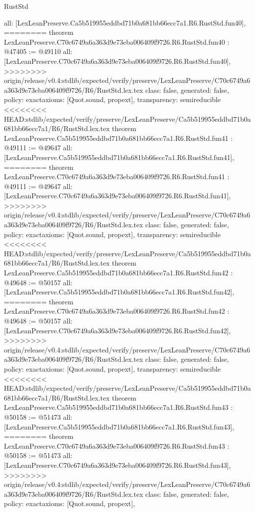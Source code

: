 \begin{lexlean}{RustStd}
\begin{coremodule}
{\begin{coremodule}
{{{{{{{{{{{{{{{{{{{{{{{{{{{{{{{{{{{{{{{{{{{  all: [LexLeanPreserve.Ca5b519955eddbd71b0a681bb66ecc7a1.R6.RustStd.fun40],
========
theorem LexLeanPreserve.C70c6749a6a363d9e73eba006409f9726.R6.RustStd.fun40 : @47405 := @49110 {
  all: [LexLeanPreserve.C70c6749a6a363d9e73eba006409f9726.R6.RustStd.fun40],
>>>>>>>> origin/release/v0.4:stdlib/expected/verify/preserve/LexLeanPreserve/C70c6749a6a363d9e73eba006409f9726/R6/RustStd.lex.tex
  class: false,
  generated: false,
  policy: exact{axioms: [Quot.sound, propext]},
  transparency: semireducible
}
<<<<<<<< HEAD:stdlib/expected/verify/preserve/LexLeanPreserve/Ca5b519955eddbd71b0a681bb66ecc7a1/R6/RustStd.lex.tex
theorem LexLeanPreserve.Ca5b519955eddbd71b0a681bb66ecc7a1.R6.RustStd.fun41 : @49111 := @49647 {
  all: [LexLeanPreserve.Ca5b519955eddbd71b0a681bb66ecc7a1.R6.RustStd.fun41],
========
theorem LexLeanPreserve.C70c6749a6a363d9e73eba006409f9726.R6.RustStd.fun41 : @49111 := @49647 {
  all: [LexLeanPreserve.C70c6749a6a363d9e73eba006409f9726.R6.RustStd.fun41],
>>>>>>>> origin/release/v0.4:stdlib/expected/verify/preserve/LexLeanPreserve/C70c6749a6a363d9e73eba006409f9726/R6/RustStd.lex.tex
  class: false,
  generated: false,
  policy: exact{axioms: [Quot.sound, propext]},
  transparency: semireducible
}
<<<<<<<< HEAD:stdlib/expected/verify/preserve/LexLeanPreserve/Ca5b519955eddbd71b0a681bb66ecc7a1/R6/RustStd.lex.tex
theorem LexLeanPreserve.Ca5b519955eddbd71b0a681bb66ecc7a1.R6.RustStd.fun42 : @49648 := @50157 {
  all: [LexLeanPreserve.Ca5b519955eddbd71b0a681bb66ecc7a1.R6.RustStd.fun42],
========
theorem LexLeanPreserve.C70c6749a6a363d9e73eba006409f9726.R6.RustStd.fun42 : @49648 := @50157 {
  all: [LexLeanPreserve.C70c6749a6a363d9e73eba006409f9726.R6.RustStd.fun42],
>>>>>>>> origin/release/v0.4:stdlib/expected/verify/preserve/LexLeanPreserve/C70c6749a6a363d9e73eba006409f9726/R6/RustStd.lex.tex
  class: false,
  generated: false,
  policy: exact{axioms: [Quot.sound, propext]},
  transparency: semireducible
}
<<<<<<<< HEAD:stdlib/expected/verify/preserve/LexLeanPreserve/Ca5b519955eddbd71b0a681bb66ecc7a1/R6/RustStd.lex.tex
theorem LexLeanPreserve.Ca5b519955eddbd71b0a681bb66ecc7a1.R6.RustStd.fun43 : @50158 := @51473 {
  all: [LexLeanPreserve.Ca5b519955eddbd71b0a681bb66ecc7a1.R6.RustStd.fun43],
========
theorem LexLeanPreserve.C70c6749a6a363d9e73eba006409f9726.R6.RustStd.fun43 : @50158 := @51473 {
  all: [LexLeanPreserve.C70c6749a6a363d9e73eba006409f9726.R6.RustStd.fun43],
>>>>>>>> origin/release/v0.4:stdlib/expected/verify/preserve/LexLeanPreserve/C70c6749a6a363d9e73eba006409f9726/R6/RustStd.lex.tex
  class: false,
  generated: false,
  policy: exact{axioms: [Quot.sound, propext]},
}}}}}}}}}}}}}}}}}}}}}}}}}}}}}}}}}}}}}}}}}}}}}}}
\end{coremodule}}
\end{coremodule}
\end{lexlean}
